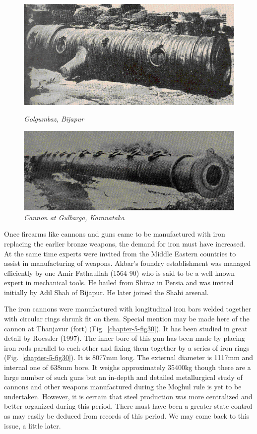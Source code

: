 
\begin{figure}[H]
\includegraphics[scale=2.5]{images/chapter-5/Fig38.jpg}\label{chapter-5-fig38}
\caption{\textit{Golgumbaz, Bijapur}}
\end{figure}
\begin{figure}[H]
\includegraphics[scale=2.5]{images/chapter-5/Fig39.jpg}
\caption{\textit{Cannon at Gulbarga, Karanataka}}\label{chapter-5-fig39}
\end{figure}


\vspace{-.3cm}

Once firearms like cannons and guns came to be manufactured with iron replacing the earlier bronze weapons, the demand for iron must have increased. At the same time experts were invited from the Middle Eastern countries to assist in manufacturing of weapons. Akbar’s foundry establishment was managed efficiently by one Amir Fathaullah (1564-90) who is said to be a well known expert in mechanical tools. He hailed from Shiraz in Persia and was invited initially by Adil Shah of Bijapur. He later joined the Shahi arsenal.

The iron cannons were manufactured with longitudinal iron bars welded together with circular rings shrunk fit on them. Special mention may be made here of the cannon at Thanjavur (fort) (Fig.~\ref{chapter-5-fig30}). It has been studied in great detail by Roessler (1997). The inner bore of this gun has been made by placing iron rods parallel to each other and fixing them together by a series of iron rings (Fig.~\ref{chapter-5-fig30}). It is 8077mm long. The external diameter is 1117mm and internal one of 638mm bore. It weighs approximately 35400kg though there are a large number of such guns but an in-depth and detailed metallurgical study of cannons and other weapons manufactured during the Moghul rule is yet to be undertaken. However, it is certain that steel production was more centralized and better organized during this period. There must have been a greater state control as may easily be deduced from records of this period. We may come back to this issue, a little later.


